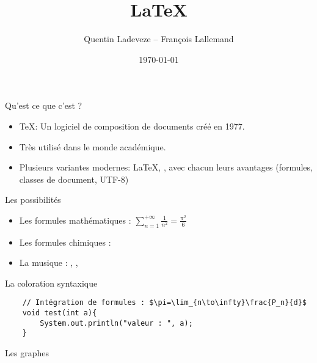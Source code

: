\documentclass{beamer}
\title{\LaTeX}
\author{Quentin Ladeveze -- François Lallemand}
\date{\today}
\begin{document}
\begin{frame}
  \titlepage
\end{frame}

\begin{frame}{Qu'est ce que c'est ?}

\begin{itemize}
    \item \TeX : Un logiciel de composition de documents créé en 1977.
    \item Très utilisé dans le monde académique.
    \item Plusieurs variantes modernes: \LaTeX, \XeTeX, \LuaTeX avec chacun leurs avantages (formules, classes  de document, UTF-8)
\end{itemize}

\end{frame}

\begin{frame}[fragile]{Les possibilités}

\begin{itemize}
    \item Les formules mathématiques : $\sum_{n=1}^{+\infty}\frac{1}{n^2}=\frac{\pi^2}{6}$
    \item Les formules chimiques :
    \item La musique : \ZwPa, \Halb, \AAcht
\end{itemize}

\vfill

\begin{minipage}[t]{0.48\linewidth}
    La coloration syntaxique
    \fontsize{8pt}{8pt}\selectfont
    \hfill
    \vfill
    \begin{verbatim}
    // Intégration de formules : $\pi=\lim_{n\to\infty}\frac{P_n}{d}$
    void test(int a){
        System.out.println("valeur : ", a);
    }
    \end{verbatim}
    \vfill
    \hfill
\end{minipage}
\hfill
\begin{minipage}[t]{0.48\linewidth}
    \hspace{60pt}
    Les graphes
    \vspace{40pt}
    \hfill
    \hfill
    \vfill
\end{minipage}

\end{frame}
\end{document}
